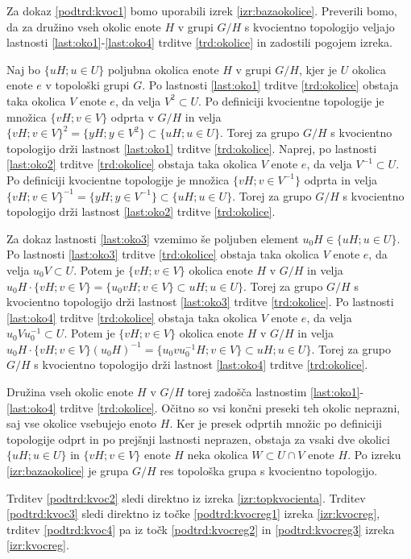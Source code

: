 \documentclass[mat1]{fmfdelo}
\begin{document}
\begin{dokaz}
Za dokaz \ref{podtrd:kvoc1} bomo uporabili izrek \ref{izr:bazaokolice}. Preverili bomo, da za družino vseh okolic enote $H$ v grupi $G/H$ s kvocientno topologijo veljajo lastnosti \ref{last:oko1}-\ref{last:oko4} trditve \ref{trd:okolice} in zadostili pogojem izreka.

Naj bo $\lbrace uH ; u \in U \rbrace$ poljubna okolica enote $H$ v grupi $G/H$, kjer je $U$ okolica enote $e$ v topološki grupi $G$. Po lastnosti \ref{last:oko1} trditve \ref{trd:okolice} obstaja taka okolica $V$ enote $e$, da velja $V^2 \subset U$. Po definiciji kvocientne topologije je množica $\lbrace vH ; v \in V \rbrace$ odprta v $G/H$ in velja $\lbrace vH ; v \in V \rbrace^2 = \lbrace yH ; y \in V^2 \rbrace \subset \lbrace uH ; u \in U \rbrace$. Torej za grupo $G/H$ s kvocientno topologijo drži lastnost \ref{last:oko1} trditve \ref{trd:okolice}.
Naprej, po lastnosti \ref{last:oko2} trditve \ref{trd:okolice} obstaja taka okolica $V$ enote $e$, da velja $V^{-1} \subset U$. Po definiciji kvocientne topologije je množica $\lbrace vH ; v \in V^{-1} \rbrace$ odprta in velja $\lbrace vH ; v \in V \rbrace^{-1} = \lbrace yH ; y \in V^{-1} \rbrace \subset \lbrace uH ; u \in U \rbrace$. Torej za grupo $G/H$ s kvocientno topologijo drži lastnost \ref{last:oko2} trditve \ref{trd:okolice}.

Za dokaz lastnosti \ref{last:oko3} vzemimo še poljuben element $u_0H \in \lbrace uH ; u \in U \rbrace$. Po lastnosti \ref{last:oko3} trditve \ref{trd:okolice} obstaja taka okolica $V$ enote $e$, da velja $u_0V \subset U$. Potem je $\lbrace vH ; v \in V \rbrace$ okolica enote $H$ v $G/H$ in velja $u_0H\cdot\lbrace vH ; v \in V\rbrace = \lbrace u_0vH ; v \in V \rbrace \subset uH ; u \in U \rbrace$. Torej za grupo $G/H$ s kvocientno topologijo drži lastnost \ref{last:oko3} trditve \ref{trd:okolice}.
Po lastnosti \ref{last:oko4} trditve \ref{trd:okolice} obstaja taka okolica $V$ enote $e$, da velja $u_0Vu_0^{-1} \subset U$. Potem je $\lbrace vH ; v \in V \rbrace$ okolica enote $H$ v $G/H$ in velja $u_0H\cdot\lbrace vH ; v \in V\rbrace (u_0H)^{-1} = \lbrace u_0vu_0^{-1}H ; v \in V \rbrace \subset uH ; u \in U \rbrace$. Torej za grupo $G/H$ s kvocientno topologijo drži lastnost \ref{last:oko4} trditve \ref{trd:okolice}.

Družina vseh okolic enote $H$ v $G/H$ torej zadošča lastnostim \ref{last:oko1}-\ref{last:oko4} trditve \ref{trd:okolice}. Očitno so vsi končni preseki teh okolic neprazni, saj vse okolice vsebujejo enoto $H$. Ker je presek odprtih množic po definiciji topologije odprt in po prejšnji lastnosti neprazen, obstaja za vsaki dve okolici $\lbrace uH ; u \in U \rbrace$ in $\lbrace vH ; v \in V \rbrace$ enote $H$ neka okolica $W \subset U \cap V$ enote $H$. Po izreku \ref{izr:bazaokolice} je grupa $G/H$ res topološka grupa s kvocientno topologijo.

Trditev \ref{podtrd:kvoc2} sledi direktno iz izreka \ref{izr:topkvocienta}.
Trditev \ref{podtrd:kvoc3} sledi direktno iz točke \ref{podtrd:kvocreg1} izreka \ref{izr:kvocreg}, trditev \ref{podtrd:kvoc4} pa iz točk \ref{podtrd:kvocreg2} in \ref{podtrd:kvocreg3} izreka \ref{izr:kvocreg}.
\end{dokaz}
\end{document}
